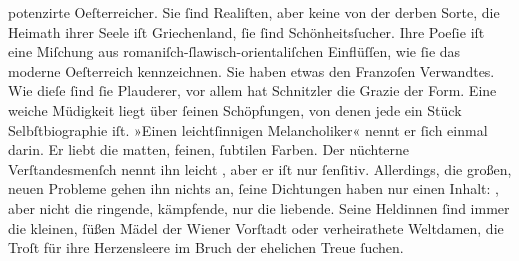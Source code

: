 {{                  potenzirte Oeſterreicher. Sie{ }ſind
                  Realiſten, aber keine von der derben Sorte, die Heimath ihrer Seele iſt Griechenland,{ }ſie{ }ſind Schönheitsſucher. Ihre
                  Poeſie iſt eine Miſchung aus romaniſch-ſlawisch-orientaliſchen Einflüſſen, wie{ }ſie
                  das moderne Oeſterreich kennzeichnen. Sie
                  haben etwas den Franzoſen
                  Verwandtes. Wie dieſe{ }ſind{ }ſie Plauderer, vor allem hat Schnitzler die Grazie der
                  Form. Eine weiche Müdigkeit liegt über{ }ſeinen Schöpfungen, von denen jede ein
                  Stück Selbſtbiographie iſt. »Einen leichtſinnigen Melancholiker« nennt er{ }ſich einmal darin. Er liebt
                  die matten, feinen,{ }ſubtilen Farben. Der nüchterne Verſtandesmenſch nennt ihn
                  leicht , aber er iſt nur{ }ſenſitiv. Allerdings,
                  die großen, neuen Probleme gehen ihn nichts an,{ }ſeine Dichtungen haben nur einen
                  Inhalt: , aber nicht die ringende, kämpfende,
                  nur die liebende. Seine Heldinnen{ }ſind immer die kleinen,{ }ſüßen Mädel der Wiener Vorſtadt oder verheirathete Weltdamen,
                  die Troſt für ihre Herzensleere im Bruch der ehelichen Treue{ }ſuchen.}}\pend
           
